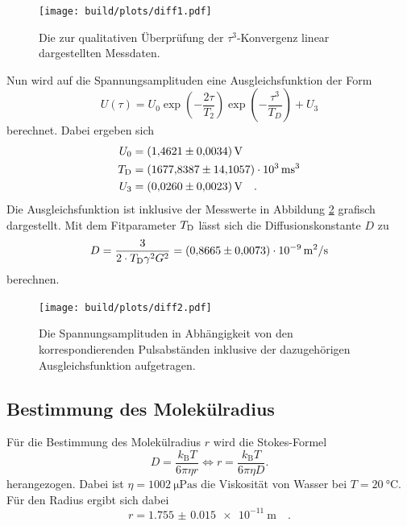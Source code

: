 \begin{figure}[H]
  \centering
  \texttt{[image: build/plots/diff1.pdf]}
  \caption{Die zur qualitativen Überprüfung der $\tau^3$-Konvergenz linear dargestellten Messdaten. }
\label{img:diff1}
\end{figure}


\noindent 
Nun wird auf die Spannungsamplituden eine Ausgleichsfunktion der Form 
\begin{equation*}
  U\left(\tau\right) = U_0 \exp{\left(-\frac{2\tau}{T_2}\right)} \exp{\left(-\frac{\tau^3}{T_D}\right)} + U_3
\end{equation*}
berechnet. Dabei ergeben sich
\begin{align*}
  U_0 &= \SI{1.4621(34)}{\volt}\\
  T_\t{D} &= \SI{1677.8387(141057)e3}{\milli\second^3}\\
  U_3 &= \SI{0.0260(23)}{\volt} \quad .
\end{align*}
Die Ausgleichsfunktion ist inklusive der Messwerte in Abbildung \ref{img:diff2} grafisch dargestellt.
Mit dem Fitparameter $T_\t{D}$ lässt sich die Diffusionskonstante $D$ zu 
\begin{equation*}
  D = \frac{3}{2\cdot T_\t{D} \gamma^2 G^2} = \SI{0.8665(73)e-9}{\metre^2\per\second}
\end{equation*}
berechnen. 


\begin{figure}[H]
  \centering
  \texttt{[image: build/plots/diff2.pdf]}
  \caption{Die Spannungsamplituden in Abhängigkeit von den korrespondierenden Pulsabständen inklusive der dazugehörigen Ausgleichsfunktion aufgetragen. }
\label{img:diff2}
\end{figure}



\subsection{Bestimmung des Molekülradius}


\noindent
Für die Bestimmung des Molekülradius $r$ wird die Stokes-Formel 
\begin{equation*}
  D = \frac{k_\text{B}T}{6\pi\eta r} \iff r = \frac{k_\text{B}T}{6 \pi\eta D}.
\end{equation*}
herangezogen. Dabei ist $\eta = \SI{1002}{\micro\pascal\second} $\cite{visko} die Viskosität von Wasser bei $T= \SI{20}{\degreeCelsius}$.
Für den Radius ergibt sich dabei 
\begin{equation*}
  r = \SI{1.755(15)e-11}{\metre} \quad .
\end{equation*}

